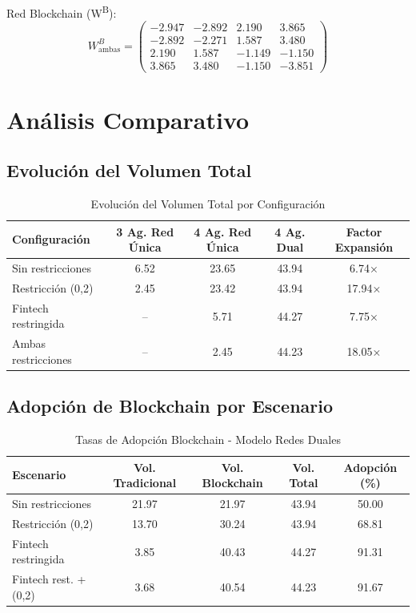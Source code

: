 \documentclass[12pt]{article}
\begin{document}
Red Blockchain (W\textsuperscript{B}):
\begin{equation}
W^B_{\text{ambas}} = \begin{pmatrix}
-2.947 & -2.892 &  2.190 &  3.865 \\
-2.892 & -2.271 &  1.587 &  3.480 \\
 2.190 &  1.587 & -1.149 & -1.150 \\
 3.865 &  3.480 & -1.150 & -3.851
\end{pmatrix}
\end{equation}

\section{Análisis Comparativo}

\subsection{Evolución del Volumen Total}

\begin{table}[H]
\centering
\caption{Evolución del Volumen Total por Configuración}
\begin{tabular}{lcccc}
\toprule
\textbf{Configuración} & \textbf{3 Ag. Red Única} & \textbf{4 Ag. Red Única} & \textbf{4 Ag. Dual} & \textbf{Factor Expansión} \\
\midrule
Sin restricciones & 6.52 & 23.65 & 43.94 & 6.74× \\
Restricción (0,2) & 2.45 & 23.42 & 43.94 & 17.94× \\
Fintech restringida & -- & 5.71 & 44.27 & 7.75× \\
Ambas restricciones & -- & 2.45 & 44.23 & 18.05× \\
\bottomrule
\end{tabular}
\end{table}

\subsection{Adopción de Blockchain por Escenario}

\begin{table}[H]
\centering
\caption{Tasas de Adopción Blockchain - Modelo Redes Duales}
\begin{tabular}{lcccc}
\toprule
\textbf{Escenario} & \textbf{Vol. Tradicional} & \textbf{Vol. Blockchain} & \textbf{Vol. Total} & \textbf{Adopción (\%)} \\
\midrule
Sin restricciones & 21.97 & 21.97 & 43.94 & 50.00 \\
Restricción (0,2) & 13.70 & 30.24 & 43.94 & 68.81 \\
Fintech restringida & 3.85 & 40.43 & 44.27 & 91.31 \\
Fintech rest. + (0,2) & 3.68 & 40.54 & 44.23 & 91.67 \\
\bottomrule
\end{tabular}
\end{table}
\end{document}

